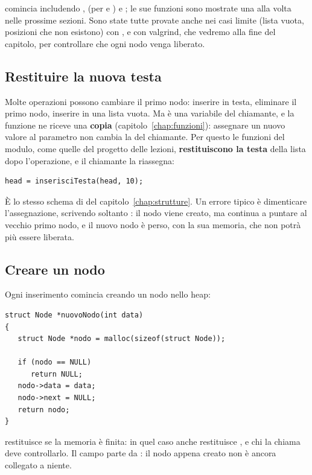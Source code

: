  comincia includendo ,  (per
 e ) e ; le sue funzioni sono mostrate
una alla volta nelle prossime sezioni. Sono state tutte provate anche nei
casi limite (lista vuota, posizioni che non esistono) con
, e con valgrind, che vedremo alla fine del
capitolo, per controllare che ogni nodo venga liberato.

\subsection{Restituire la nuova testa}

Molte operazioni possono cambiare il primo nodo: inserire in testa, eliminare
il primo nodo, inserire in una lista vuota. Ma  è una variabile
del chiamante, e la funzione ne riceve una \textbf{copia}
(capitolo~\ref{chap:funzioni}): assegnare un nuovo valore al parametro non
cambia la  del chiamante. Per questo le funzioni del modulo, come
quelle del progetto delle lezioni, \textbf{restituiscono la testa} della
lista dopo l'operazione, e il chiamante la riassegna:

\begin{lstlisting}[style=c]
head = inserisciTesta(head, 10);
\end{lstlisting}

È lo stesso schema di  del
capitolo~\ref{chap:strutture}. Un errore tipico è dimenticare
l'assegnazione, scrivendo soltanto : il nodo
viene creato, ma  continua a puntare al vecchio primo nodo, e il
nuovo nodo è perso, con la sua memoria, che non potrà più essere liberata.

\subsection{Creare un nodo}

Ogni inserimento comincia creando un nodo nello heap:

\begin{affianco}[0.55][c]
\begin{lstlisting}[style=c, name=lista.c]
struct Node *nuovoNodo(int data)
{
   struct Node *nodo = malloc(sizeof(struct Node));

   if (nodo == NULL)
      return NULL;
   nodo->data = data;
   nodo->next = NULL;
   return nodo;
}
\end{lstlisting}
\risultato
{} restituisce  se la memoria è finita: in quel caso
anche  restituisce , e chi la chiama deve
controllarlo. Il campo  parte da : il nodo appena
creato non è ancora collegato a niente.
\end{affianco}


